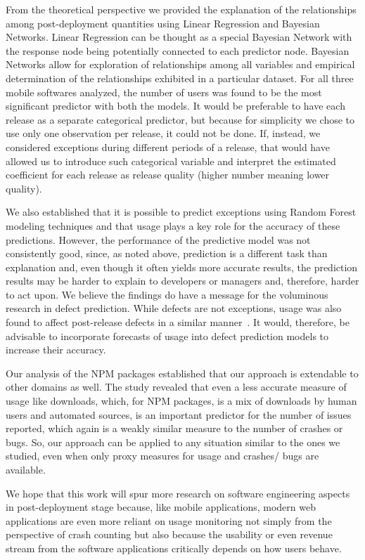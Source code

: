 \documentclass[smallextended]{svjour3}       %
\begin{document}
From the theoretical perspective we provided the explanation of the
relationships among post-deployment quantities using Linear
Regression and Bayesian Networks. Linear Regression can be thought
as a special Bayesian Network with the response node being
potentially connected to each predictor node. Bayesian Networks
allow for exploration of relationships among all variables and
empirical determination of the relationships exhibited in a
particular dataset.  For all three mobile softwares analyzed, the number of users was found to be the most significant predictor with both the models. It would be preferable to have each release as a separate
categorical predictor, but because for simplicity we chose to use
only one observation per release, it could not be done. If, instead,
we considered exceptions during different periods of a release, that
would have allowed us to introduce such categorical variable and
interpret the estimated coefficient for each release as release
quality (higher number meaning lower quality).

We also established
that it is possible to predict exceptions using Random Forest
modeling techniques and that usage plays a key role for the accuracy
of these predictions. However, the performance of the predictive model was not consistently good, since, as noted above, prediction is a different task
than explanation and, even though it often yields more accurate
results, the prediction results may be harder to explain to
developers or managers and, therefore, harder to act upon. We
believe the findings do have a message for the voluminous research
in defect prediction. While defects are not exceptions, usage was
also found to affect post-release defects in a similar
manner~\cite{caper,hmps15,mockus2005predictors}. It would, therefore, be advisable to 
incorporate forecasts of usage into defect prediction models  to increase their accuracy.

Our analysis of the NPM packages established that our approach is extendable to other domains as well. 
The study revealed that even a less accurate measure of usage like downloads, which, for NPM packages, 
is a mix of downloads by human users and automated sources, is an important predictor for the number 
of issues reported, which again is a weakly similar measure to the number of crashes or bugs. 
So, our approach can be applied to any situation similar to the ones we studied, even when only 
proxy measures for usage and crashes/ bugs are available.

We hope that this work will spur more research on software engineering
aspects in post-deployment stage because, like mobile applications, 
modern web applications are even more reliant on usage monitoring not
simply from the perspective of crash counting but also because the
usability or even revenue stream from the software applications
critically depends on how users behave. 
\end{document}
